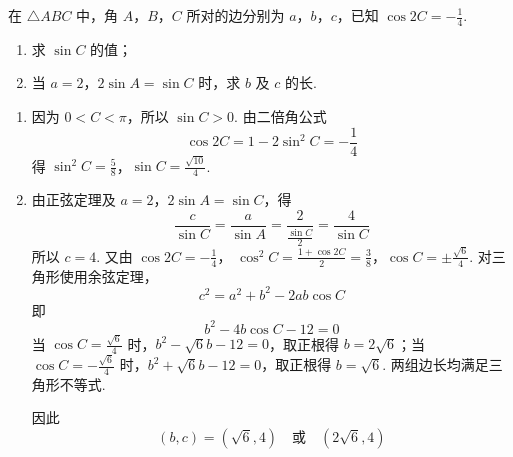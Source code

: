 \begin{problem}
在 \(\triangle ABC\) 中，角 \(A\)，\(B\)，\(C\) 所对的边分别为 \(a\)，\(b\)，\(c\)，已知 \(\cos 2C = -\frac{1}{4}\).

\begin{enumerate}
\item 求 \(\sin C\) 的值；
\item 当 \(a = 2\)，\(2 \sin A = \sin C\) 时，求 \(b\) 及 \(c\) 的长.
\end{enumerate}

\begin{solution}
\begin{enumerate}
\item 因为 \(0<C<\pi\)，所以 \(\sin C>0\). 由二倍角公式
\[
\cos2C=1-2\sin^2C=-\frac14
\]
得
\(\sin^2C=\frac58\)，\(\sin C=\frac{\sqrt{10}}4\).

\item 由正弦定理及 \(a=2\)，\(2\sin A=\sin C\)，得
\[
\frac{c}{\sin C}=\frac{a}{\sin A}
=\frac{2}{\frac{\sin C}{2}}=\frac4{\sin C}
\]
所以 \(c=4\). 又由 \(\cos2C=-\frac14\)，
\(\cos^2C=\frac{1+\cos2C}{2}=\frac38\)，\(\cos C=\pm\frac{\sqrt6}{4}\).
对三角形使用余弦定理，
\[
c^2=a^2+b^2-2ab\cos C
\]
即
\[
b^2-4b\cos C-12=0
\]
当 \(\cos C=\frac{\sqrt6}{4}\) 时，\(b^2-\sqrt6b-12=0\)，取正根得 \(b=2\sqrt6\)；当 \(\cos C=-\frac{\sqrt6}{4}\) 时，\(b^2+\sqrt6b-12=0\)，取正根得 \(b=\sqrt6\). 两组边长均满足三角形不等式.

因此
\[
(b,c)=(\sqrt6,4)\quad\text{或}\quad(2\sqrt6,4)
\]
\end{enumerate}
\end{solution}
\end{problem}

